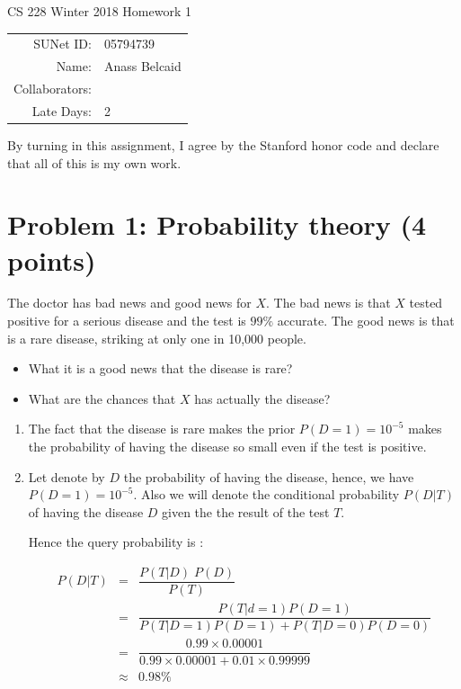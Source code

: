 \documentclass[10pt]{article}
\begin{document}
\begin{center}
{\Large CS 228 Winter 2018 Homework 1}

\begin{tabular}{rl}
SUNet ID: & 05794739 \\
Name: & Anass Belcaid \\
Collaborators: & \\
Late Days: & 2
\end{tabular}
\end{center}

By turning in this assignment, I agree by the Stanford honor code and declare
that all of this is my own work.
\section*{Problem 1: Probability theory (4 points)}

The doctor  has bad news and good news for $X$. The bad news is that $X$ tested
positive for a serious disease and the test is $99\%$ accurate. The good news is
that is a rare disease, striking at only one in 10,000 people.

\begin{itemize}
  \item What it is a good news that the disease is rare?
    \item What are the chances that $X$ has actually the disease?
  \end{itemize}

\begin{enumerate}[label=(\alph*)]
  \item The fact that the disease is rare makes the prior $P(D=1)=10^{-5}$ makes
    the probability of having the disease so small even if the test is positive.
    \item Let denote by $D$ the probability of having the disease, hence, we
      have $P(D=1) = 10^{-5}$. Also we will denote the conditional probability
      $P(D | T)$ of having the disease $D$ given the the result of the test $T$.

      Hence the query probability is :

      \begin{eqnarray}
        P(D | T) & = & \dfrac{ P(T | D)\; P(D)}{P(T)}\\
                 & = & \dfrac{P(T|d=1)P(D=1) }{ P(T|D=1)P(D=1) + P(T|D=0)P(D=0)  }\\
                 & = & \dfrac{ 0.99\times 0.00001}{ 0.99\times 0.00001 + 0.01\times0.99999} \\
                 & \approx & 0.98\%
        \end{eqnarray}
\end{enumerate}
\end{document}
